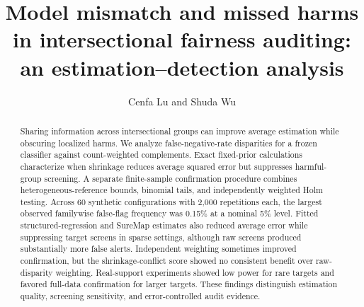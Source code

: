 \documentclass[Afour,sageh,times,doublespace]{sagej}
\newif\ifreviewcopy
\begin{document}
\ifreviewcopy
\runninghead{Intersectional fairness auditing}
\author{Anonymous review manuscript}
\else
{}
\author{Cenfa Lu and Shuda Wu}
\fi
\title{Model mismatch and missed harms in intersectional fairness auditing: an estimation--detection analysis}
\begin{abstract}
Sharing information across intersectional groups can improve average estimation while obscuring localized harms. We analyze false-negative-rate disparities for a frozen classifier against count-weighted complements. Exact fixed-prior calculations characterize when shrinkage reduces average squared error but suppresses harmful-group screening. A separate finite-sample confirmation procedure combines heterogeneous-reference bounds, binomial tails, and independently weighted Holm testing. Across 60 synthetic configurations with 2,000 repetitions each, the largest observed familywise false-flag frequency was 0.15\% at a nominal 5\% level. Fitted structured-regression and SureMap estimates also reduced average error while suppressing target screens in sparse settings, although raw screens produced substantially more false alerts. Independent weighting sometimes improved confirmation, but the shrinkage-conflict score showed no consistent benefit over raw-disparity weighting. Real-support experiments showed low power for rare targets and favored full-data confirmation for larger targets. These findings distinguish estimation quality, screening sensitivity, and error-controlled audit evidence.
\end{abstract}
\maketitle
\end{document}
